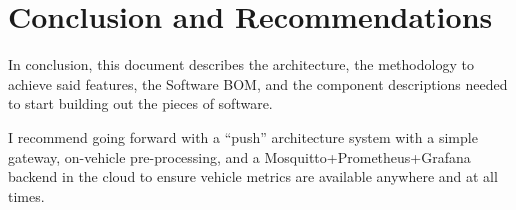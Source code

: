 \section{Conclusion and Recommendations}

In conclusion, this document describes the architecture, the methodology to achieve said features, the Software BOM, and the component descriptions needed to start building out the pieces of software.

I recommend going forward with a ``push'' architecture system with a simple gateway, on-vehicle pre-processing, and a Mosquitto+Prometheus+Grafana backend in the cloud to ensure vehicle metrics are available anywhere and at all times.